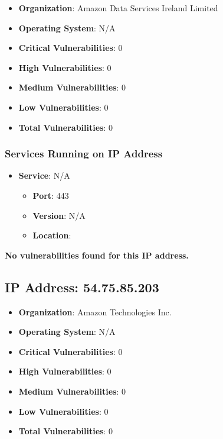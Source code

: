 \documentclass{article}
\begin{document}
\begin{itemize}
    \item \textbf{Organization}: Amazon Data Services Ireland Limited
    \item \textbf{Operating System}:  N/A 
    \item \textbf{Critical Vulnerabilities}: 0
    \item \textbf{High Vulnerabilities}: 0
    \item \textbf{Medium Vulnerabilities}: 0
    \item \textbf{Low Vulnerabilities}: 0
    \item \textbf{Total Vulnerabilities}: 0
\end{itemize}

\subsubsection*{Services Running on IP Address}

\begin{itemize}
    
        \item \textbf{Service}: N/A
        \begin{itemize}
            \item \textbf{Port}: 443
            \item \textbf{Version}:  N/A 
            \item \textbf{Location}: \href{  }{  }
        \end{itemize}
    
\end{itemize}


\textbf{No vulnerabilities found for this IP address.}




\clearpage



\subsection{IP Address: 54.75.85.203}

\begin{itemize}
    \item \textbf{Organization}: Amazon Technologies Inc.
    \item \textbf{Operating System}:  N/A 
    \item \textbf{Critical Vulnerabilities}: 0
    \item \textbf{High Vulnerabilities}: 0
    \item \textbf{Medium Vulnerabilities}: 0
    \item \textbf{Low Vulnerabilities}: 0
    \item \textbf{Total Vulnerabilities}: 0
\end{itemize}
\end{document}
